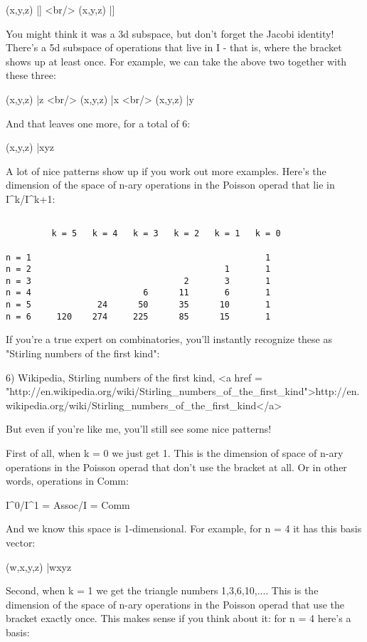 (x,y,z) |\to  [x,[y,z]] <br/>
(x,y,z) |\to  [y,[x,z]]

You might think it was a 3d subspace, but don't forget the Jacobi
identity!  There's a 5d subspace of operations that live in I - that
is, where the bracket shows up at least once.  For example, we can
take the above two together with these three:

(x,y,z) |\to  [x,y]z <br/>
(x,y,z) |\to  [y,z]x <br/>
(x,y,z) |\to  [x,z]y

And that leaves one more, for a total of 6:

(x,y,z) |\to  xyz

A lot of nice patterns show up if you work out more examples.  Here's
the dimension of the space of n-ary operations in the Poisson operad
that lie in I^{k}/I^{k+1}:
                               

\begin{verbatim}

         k = 5   k = 4   k = 3   k = 2   k = 1   k = 0
          
n = 1                                              1
n = 2                                      1       1
n = 3                              2       3       1
n = 4                      6      11       6       1
n = 5             24      50      35      10       1
n = 6     120    274     225      85      15       1
\end{verbatim}
    
If you're a true expert on combinatories, you'll instantly
recognize these as "Stirling numbers of the first kind":

6) Wikipedia, Stirling numbers of the first kind,
<a href = "http://en.wikipedia.org/wiki/Stirling_numbers_of_the_first_kind">http://en.wikipedia.org/wiki/Stirling_numbers_of_the_first_kind</a>

But even if you're like me, you'll still see some nice patterns!

First of all, when k = 0 we just get 1.  This is the dimension of
space of n-ary operations in the Poisson operad that don't use the
bracket at all.  Or in other words, operations in Comm:

I^{0}/I^{1} = Assoc/I = Comm

And we know this space is 1-dimensional.  For example, for n = 4 it
has this basis vector:

(w,x,y,z) |\to  wxyz

Second, when k = 1 we get the triangle numbers 1,3,6,10,....  This is
the dimension of the space of n-ary operations in the Poisson operad
that use the bracket exactly once.  This makes sense if you think
about it: for n = 4 here's a basis:


